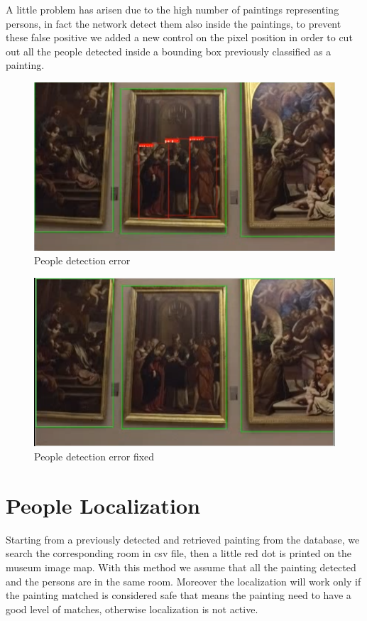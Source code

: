 \documentclass[conference]{IEEEtran}
\begin{document}
A little problem has arisen due to the high number of paintings representing persons, in fact the network detect them also inside the paintings, to prevent these false positive we added a new control on the pixel position in order to cut out all the people detected inside a bounding box previously classified as a painting.

\begin{figure}[htbp]
\centerline{\includegraphics[width=0.8\columnwidth]{../people_detection/people_error.png}}
\caption{People detection error}
\label{fig_People_detection_error}
\end{figure}

\begin{figure}[htbp]
\centerline{\includegraphics[width=0.8\columnwidth]{../people_detection/people_error_fixed.png}}
\caption{People detection error fixed}
\label{fig_People_detection_error_fixed}
\end{figure}

\section{People Localization}
Starting from a previously detected and retrieved painting from the database, we search the corresponding room in csv file, then a little red dot is printed on the museum image map. With this method we assume that all the painting detected and the persons are in the same room.
Moreover the localization will work only if the painting matched is considered safe that means the painting need to have a good level of matches, otherwise localization is not active.
\end{document}
